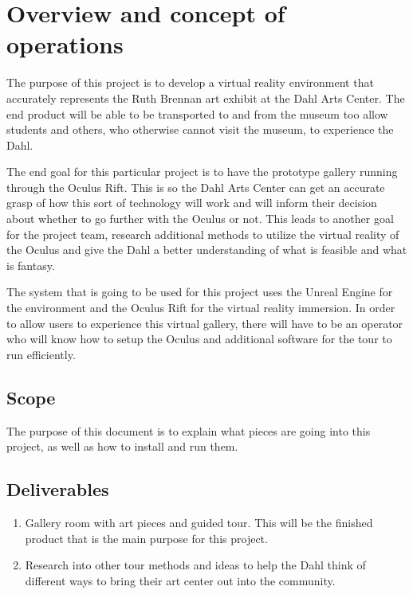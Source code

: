 
\chapter{Overview and concept of operations}

The purpose of this project is to develop a virtual reality environment that accurately represents the Ruth Brennan art exhibit at the Dahl Arts Center.  The end product will be able to be transported to and from the museum too allow students and others, who otherwise cannot visit the museum, to experience the Dahl.

The end goal for this particular project is to have the prototype gallery running through the Oculus Rift.  This is so the Dahl Arts Center can get an accurate grasp of how this sort of technology will work and will inform their decision about whether to go further with the Oculus or not.  This leads to another goal for the project team, research additional methods to utilize the virtual reality of the Oculus and give the Dahl a better understanding of what is feasible and what is fantasy.

The system that is going to be used for this project uses the Unreal Engine for the environment and the Oculus Rift for the virtual reality immersion.  In order to allow users to experience this virtual gallery, there will have to be an operator who will know how to setup the Oculus and additional software for the tour to run efficiently.  

\section{Scope}
The purpose of this document is to explain what pieces are going into this project, as well as how to install and run them.

\section{Deliverables}

\begin{enumerate}
\item Gallery room with art pieces and guided tour.  This will be the finished product that is the main purpose for this project.
\item Research into other tour methods and ideas to help the Dahl think of different ways to bring their art center out into the community.
\end{enumerate}

